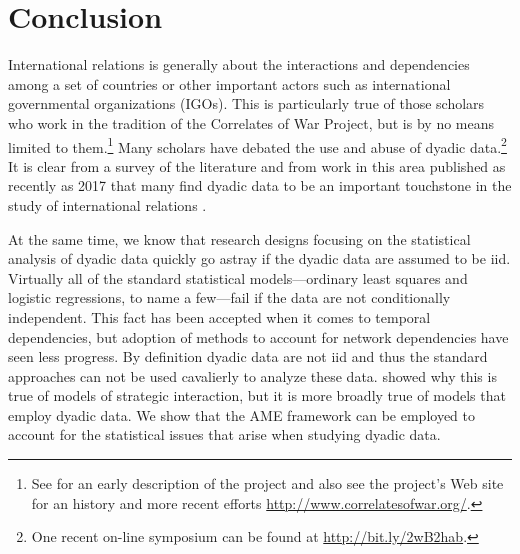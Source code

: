 \section{\textbf{Conclusion}}

International relations is generally about the interactions and dependencies among a set of countries or other important actors such as international governmental organizations (IGOs). This is particularly true of those scholars who work in the tradition of the Correlates of War Project, but is by no means limited to them.\footnote{See \cite{singer:1972} for an early description of the project and also see the project's Web site for an history and more recent efforts \url{http://www.correlatesofwar.org/}.} Many scholars have debated the use and abuse of dyadic data.\footnote{One recent on-line symposium can be found at \url{http://bit.ly/2wB2hab}.} It is clear from a survey of the literature and from work in this area published as recently as 2017 that many find dyadic data to be an important touchstone in the study of international relations \citep{erikson:pinto:2014,aronow:etal:2015}.

At the same time, we know that research designs focusing on the statistical analysis of dyadic data quickly go astray if the dyadic data are assumed to be iid.  Virtually all of the standard statistical models---ordinary least squares and logistic regressions, to name a few---fail if the data are not conditionally independent. This fact has been accepted when it comes to temporal dependencies, but adoption of methods to account for network dependencies have seen less progress. By definition dyadic data are not iid and thus the standard approaches can not be used cavalierly to analyze these data.  \citet{signorino:1999} showed why this is true of models of strategic interaction, but it is more broadly true of models that employ dyadic data.  We show that the AME framework can be employed to account for the statistical issues that arise when studying dyadic data.


